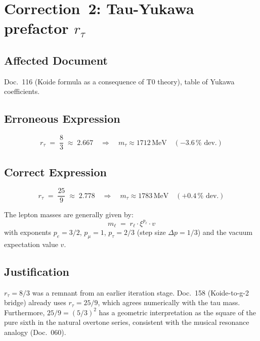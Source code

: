 \section{\texorpdfstring{Correction~2: Tau-Yukawa prefactor $r_\tau$}{Correction 2: Tau-Yukawa prefactor r-tau}}

\subsection*{Affected Document}

Doc.~116 (Koide formula as a consequence of T0 theory), table of
Yukawa coefficients.

\subsection*{Erroneous Expression}

\begin{equation}
  r_\tau \;=\; \frac{8}{3} \;\approx\; 2.667
  \quad \Rightarrow \quad
  m_\tau \approx 1712\,\text{MeV} \quad (-3.6\,\% \text{ dev.})
  \tag{old -- wrong}
\end{equation}

\subsection*{Correct Expression}

\begin{equation}
  \boxed{r_\tau \;=\; \frac{25}{9} \;\approx\; 2.778}
  \quad \Rightarrow \quad
  m_\tau \approx 1783\,\text{MeV} \quad (+0.4\,\% \text{ dev.})
  \tag{190.2}
\end{equation}

The lepton masses are generally given by:
\begin{equation}
  m_\ell \;=\; r_\ell \cdot \xi^{p_\ell} \cdot v
  \tag{190.3}
\end{equation}
with exponents $p_e = 3/2$, $p_\mu = 1$, $p_\tau = 2/3$
(step size $\Delta p = 1/3$) and the vacuum expectation value $v$.

\subsection*{Justification}

$r_\tau = 8/3$ was a remnant from an earlier iteration stage.
Doc.~158 (Koide-to-g-2 bridge) already uses $r_\tau = 25/9$, which
agrees numerically with the tau mass. Furthermore, $25/9 = (5/3)^2$
has a geometric interpretation as the square of the pure sixth in the
natural overtone series, consistent with the musical resonance analogy
(Doc.~060).

